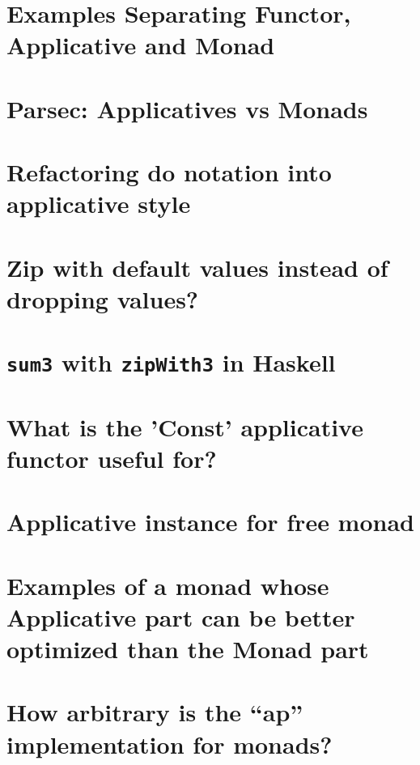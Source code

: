\documentclass{book}
\begin{document}
\section{Examples Separating Functor, Applicative and Monad}


\section{Parsec: Applicatives vs Monads}


\section{Refactoring do notation into applicative style}


\section{Zip with default values instead of dropping values?}


\section{{\tt sum3} with {\tt zipWith3} in Haskell}


\section{What is the 'Const' applicative functor useful for?}


\section{Applicative instance for free monad}


\section{Examples of a monad whose Applicative part can be better optimized than the Monad part}


\section{How arbitrary is the “ap” implementation for monads?}

\end{document}
